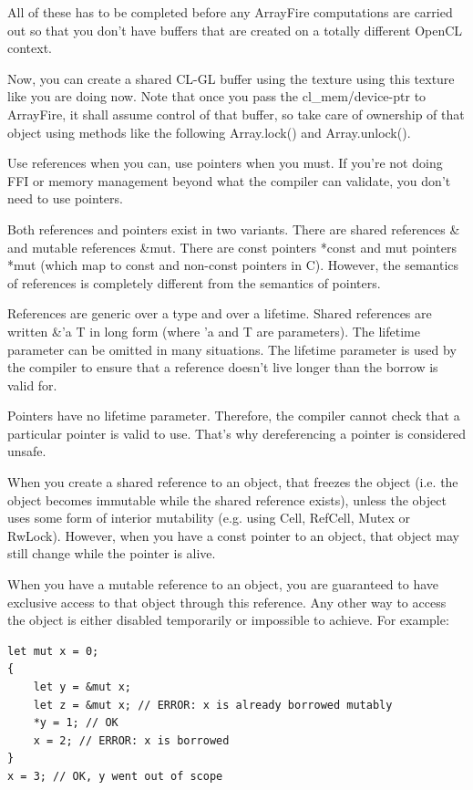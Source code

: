 All of these has to be completed before any ArrayFire computations are carried out so that you don't have buffers that are created on a totally different OpenCL context.

Now, you can create a shared CL-GL buffer using the texture using this texture like you are doing now. Note that once you pass the cl_mem/device-ptr to ArrayFire, it shall assume control of that buffer, so take care of ownership of that object using methods like the following
Array.lock() and Array.unlock().

Use references when you can, use pointers when you must. If you're not doing FFI or memory management beyond what the compiler can validate, you don't need to use pointers.

Both references and pointers exist in two variants. There are shared references \& and mutable references \&mut. There are const pointers *const and mut pointers *mut (which map to const and non-const pointers in C). However, the semantics of references is completely different from the semantics of pointers.

References are generic over a type and over a lifetime. Shared references are written \&'a T in long form (where 'a and T are parameters). The lifetime parameter can be omitted in many situations. The lifetime parameter is used by the compiler to ensure that a reference doesn't live longer than the borrow is valid for.

Pointers have no lifetime parameter. Therefore, the compiler cannot check that a particular pointer is valid to use. That's why dereferencing a pointer is considered unsafe.

When you create a shared reference to an object, that freezes the object (i.e. the object becomes immutable while the shared reference exists), unless the object uses some form of interior mutability (e.g. using Cell, RefCell, Mutex or RwLock). However, when you have a const pointer to an object, that object may still change while the pointer is alive.

When you have a mutable reference to an object, you are guaranteed to have exclusive access to that object through this reference. Any other way to access the object is either disabled temporarily or impossible to achieve. For example:

\begin{lstlisting}
let mut x = 0;
{
	let y = &mut x;
	let z = &mut x; // ERROR: x is already borrowed mutably
	*y = 1; // OK
	x = 2; // ERROR: x is borrowed
}
x = 3; // OK, y went out of scope
\end{lstlisting}

